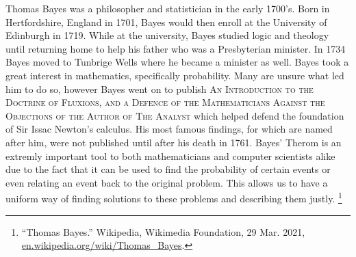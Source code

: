 \documentclass{article}
\begin{document}
Thomas Bayes was a philosopher and statistician in the early 1700's. Born in Hertfordshire, England in 1701, Bayes would then enroll at the University of Edinburgh in 1719. While at the university, Bayes studied logic and theology until returning home to help his father who was a Presbyterian minister. In 1734 Bayes moved to Tunbrige Wells where he became a minister as well. Bayes took a great interest in mathematics, specifically probability. Many are unsure what led him to do so, however Bayes went on to publish \textsc{An Introduction to the Doctrine of Fluxions, and a Defence of the Mathematicians Against the Objections of the Author of The Analyst} which helped defend the foundation of Sir Issac Newton's calculus. His most famous findings, for which are named after him, were not published until after his death in 1761. Bayes' Therom is an extremly important tool to both mathematicians and computer scientists alike due to the fact that it can be used to find the probability of certain events or even relating an event back to the original problem. This allows us to have a uniform way of finding solutions to these problems and describing them justly. \footnote{“Thomas Bayes.” Wikipedia, Wikimedia Foundation, 29 Mar. 2021, \url{en.wikipedia.org/wiki/Thomas_Bayes}.}

% 
% 
\end{document}

